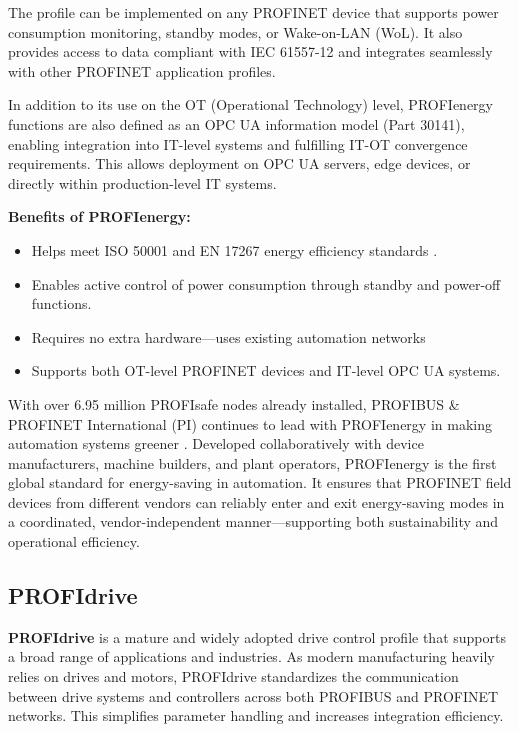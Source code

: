 \documentclass[conference]{IEEEtran}
\begin{document}
The profile can be implemented on any PROFINET device that supports power consumption monitoring, standby modes, or Wake-on-LAN (WoL). It also provides access to data compliant with IEC 61557-12 and integrates seamlessly with other PROFINET application profiles.

In addition to its use on the OT (Operational Technology) level, PROFIenergy functions are also defined as an OPC UA information model (Part 30141), enabling integration into IT-level systems and fulfilling IT-OT convergence requirements. This allows deployment on OPC UA servers, edge devices, or directly within production-level IT systems.

\textbf{Benefits of PROFIenergy:}
\begin{itemize}
    \item Helps meet ISO 50001 and EN 17267 energy efficiency standards \cite{profinet_profienergy}.
    \item Enables active control of power consumption through standby and power-off functions.
    \item Requires no extra hardware—uses existing automation networks
    \item Supports both OT-level PROFINET devices and IT-level OPC UA systems.
\end{itemize}

With over 6.95 million PROFIsafe nodes already installed, PROFIBUS \& PROFINET International (PI) continues to lead with PROFIenergy in making automation systems greener \cite{profinet_profienergy}. Developed collaboratively with device manufacturers, machine builders, and plant operators, PROFIenergy is the first global standard for energy-saving in automation. It ensures that PROFINET field devices from different vendors can reliably enter and exit energy-saving modes in a coordinated, vendor-independent manner—supporting both sustainability and operational efficiency.


\subsection{PROFIdrive}
\label{subsec: PROFIdrive}
\textbf{PROFIdrive} is a mature and widely adopted drive control profile that supports a broad range of applications and industries. As modern manufacturing heavily relies on drives and motors, PROFIdrive standardizes the communication between drive systems and controllers across both PROFIBUS and PROFINET networks. This simplifies parameter handling and increases integration efficiency.
\end{document}
